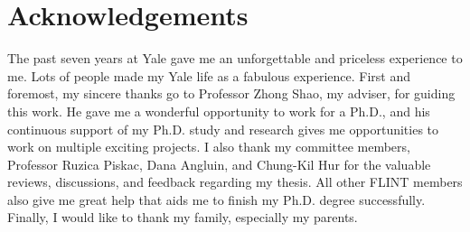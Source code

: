 \chapter{Acknowledgements} %
\thispagestyle{empty}

The past seven years at Yale gave me an unforgettable and priceless experience to me. 
Lots of people made my Yale life as a fabulous experience. 
First and foremost, my sincere thanks go to  Professor Zhong Shao, my adviser,  for guiding this work. 
He gave me a wonderful opportunity to work for a Ph.D., and his continuous support of my Ph.D. study and research gives me opportunities to work on multiple exciting projects. 
I also thank my committee members, Professor Ruzica Piskac, Dana Angluin, and Chung-Kil Hur for the valuable reviews, discussions, and feedback regarding my thesis. All other FLINT members also give me great help that aids me to finish my Ph.D. degree successfully. 
Finally, I would like to thank my family, especially my parents.



\clearpage
